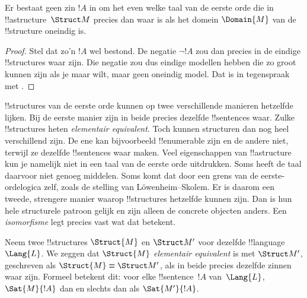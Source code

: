\documentclass[openany]{memoir}
\begin{document}
\begin{prop}
Er bestaat geen zin $!A$ in om het even welke taal van de eerste orde die
in !!a{structure}~$\Struct M$ precies dan waar is als het domein
$\Domain{M}$ van de !!{structure} oneindig is.
\end{prop}

\begin{proof}
Stel dat zo'n $!A$ wel bestond. De negatie $\lnot !A$ zou dan precies in
de eindige !!{structure}s waar zijn. Die negatie zou dus eindige modellen
hebben die zo groot kunnen zijn als je maar wilt, maar geen oneindig
model. Dat is in tegenspraak met .
\end{proof}
\endgroup

\begingroup
\def\olfilename{OLP-0187}
\def\olfilepath{content/model-theory/basics/}
\hypertarget{unit-OLP-0187}{}




!!{structure}s van de eerste orde kunnen op twee verschillende manieren
hetzelfde lijken. Bij de eerste manier zijn in beide precies dezelfde
!!{sentence}s waar. Zulke !!{structure}s heten \emph{elementair
equivalent}. Toch kunnen structuren dan nog heel verschillend zijn. De
ene kan bijvoorbeeld !!{enumerable} zijn en de andere niet, terwijl ze
dezelfde !!{sentence}s waar maken. Veel eigenschappen van
!!a{structure} kun je namelijk niet in een taal van de eerste orde
uitdrukken. Soms heeft de taal daarvoor niet genoeg middelen. Soms komt
dat door een grens van de eerste-ordelogica zelf, zoals de stelling van
L\"owenheim--Skolem. Er is daarom een tweede, strengere manier waarop
!!{structure}s hetzelfde kunnen zijn. Dan is hun hele structurele
patroon gelijk en zijn alleen de concrete objecten anders. Een
\emph{isomorfisme} legt precies vast wat dat betekent.

\begin{defn}
Neem twee !!{structure}s $\Struct{M}$ en $\Struct M'$ voor dezelfde
!!{language}~$\Lang{L}$. We zeggen dat $\Struct{M}$ \emph{elementair
equivalent} is met $\Struct M'$, geschreven als $\Struct{M} \equiv
\Struct M'$, als in beide precies dezelfde zinnen waar zijn. Formeel
betekent dit: voor elke !!{sentence}~$!A$ van~$\Lang{L}$,
$\Sat{M}{!A}$ dan en slechts dan als $\Sat{M'}{!A}$.
\end{defn}
\end{document}
